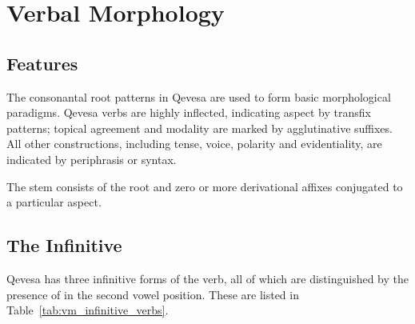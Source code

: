 \documentclass[grammar]{subfiles}
\begin{document}
  \chapter{Verbal Morphology}
  \label{ch:verbal_morphology}

  \section{Features}
  \label{sec:vm_features}

  The consonantal root patterns in Qevesa are used to form basic morphological paradigms. Qevesa verbs are highly inflected, indicating aspect by transfix patterns; topical agreement and modality are marked by agglutinative suffixes. All other constructions, including tense, voice, polarity and evidentiality, are indicated by periphrasis or syntax.

  The stem consists of the root and zero or more derivational affixes conjugated to a particular aspect. 

  \section{The Infinitive}
  \label{sec:vm_infinitive}

  Qevesa has three infinitive forms of the verb, all of which are distinguished by the presence of  in the second vowel position. These are listed in Table~\ref{tab:vm_infinitive_verbs}.
\end{document}
